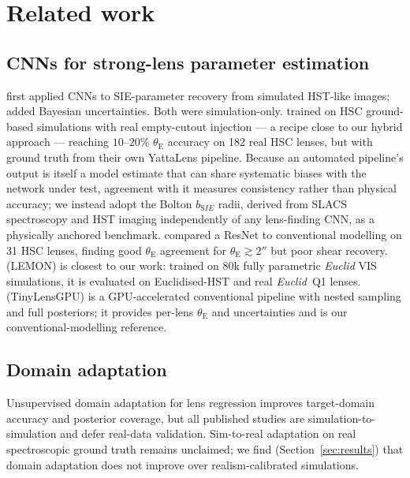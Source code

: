 \documentclass[fleqn,usenatbib]{mnras}
\newcommand{\thetaE}{\theta_{\mathrm{E}}}
\newcommand{\bsie}{b_{\mathrm SIE}}
\begin{document}
\section{Related work}
\label{sec:related}

\subsection{CNNs for strong-lens parameter estimation}
\citet{Hezaveh2017} first applied CNNs to SIE-parameter recovery from
simulated HST-like images; \citet{PerreaultLevasseur2017} added Bayesian
uncertainties. Both were simulation-only. \citet{Gawade2025} trained on HSC
ground-based simulations with real empty-cutout injection --- a recipe close to
our hybrid approach --- reaching $10$--$20\%$ $\thetaE$ accuracy on 182 real
HSC lenses, but with ground truth from their own YattaLens pipeline. Because an
automated pipeline's output is itself a model estimate that can share
systematic biases with the network under test, agreement with it measures
consistency rather than physical accuracy; we instead adopt the Bolton $\bsie$
radii, derived from SLACS spectroscopy and HST imaging independently of any
lens-finding CNN, as a physically anchored benchmark.
\citet{Schuldt2023} compared a ResNet to conventional modelling on 31 HSC
lenses, finding good $\thetaE$ agreement for $\thetaE\gtrsim2''$ but poor shear
recovery. \citet{Busillo2026} (LEMON) is closest to our work: trained on 80k
fully parametric \textit{Euclid} VIS simulations, it is evaluated on
Euclidised-HST and real \textit{Euclid}~Q1 lenses. \citet{Cao2025} (TinyLensGPU)
is a GPU-accelerated conventional pipeline with nested sampling and full
posteriors; it provides per-lens $\thetaE$ and uncertainties and is our
conventional-modelling reference.

\subsection{Domain adaptation}
Unsupervised domain adaptation for lens regression
\citep{Ciprijanovic2023,Agarwal2025,Swierc2024} improves target-domain accuracy
and posterior coverage, but all published studies are simulation-to-simulation
and defer real-data validation. Sim-to-real adaptation on real spectroscopic
ground truth remains unclaimed; we find (Section~\ref{sec:results}) that domain
adaptation does not improve over realism-calibrated simulations.
\end{document}
